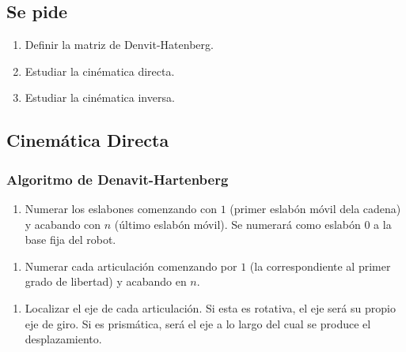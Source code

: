 \documentclass[twoside]{article}
\begin{document}
\begin{multicols}{2}
\subsection{Se pide}
\begin{enumerate}
\def\labelenumi{\arabic{enumi}.}
\itemsep1pt\parskip0pt
\item
  Definir la matriz de Denvit-Hatenberg.

\def\labelenumii{\arabic{enumii}.}
\setcounter{enumii}{1}
\itemsep1pt\parskip0pt
\item
  Estudiar la cinématica directa.

\def\labelenumiii{\arabic{enumiii}.}
\setcounter{enumiii}{2}
\itemsep1pt\parskip0pt
\item
   Estudiar la cinématica inversa.

\end{enumerate}


\subsection{Cinemática Directa}
\subsubsection{Algoritmo de Denavit-Hartenberg}
\begin{enumerate}
\def\labelenumi{\arabic{enumi}.}
\itemsep1pt\parskip0pt
\item
  Numerar los eslabones comenzando con \(1\) (primer eslabón móvil dela
  cadena) y acabando con \(n\) (último eslabón móvil). Se numerará como
  eslabón \(0\) a la base fija del robot.
\end{enumerate}

\begin{enumerate}
\def\labelenumi{\arabic{enumi}.}
\setcounter{enumi}{1}
\itemsep1pt\parskip0pt
\item
  Numerar cada articulación comenzando por \(1\) (la correspondiente al
  primer grado de libertad) y acabando en \(n\).
\end{enumerate}

\begin{enumerate}
\def\labelenumi{\arabic{enumi}.}
\setcounter{enumi}{2}
\itemsep1pt\parskip0pt
\item
  Localizar el eje de cada articulación. Si esta es rotativa, el eje
  será su propio eje de giro. Si es prismática, será el eje a lo largo
  del cual se produce el desplazamiento.
\end{enumerate}


\end{multicols}
\end{document}
